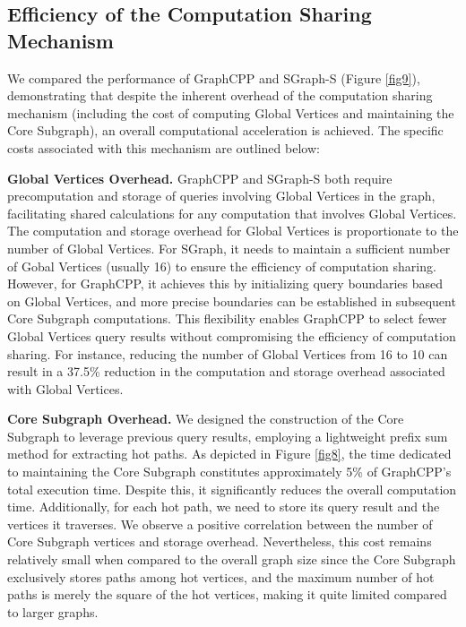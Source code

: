 \documentclass[10pt,journal,compsoc]{IEEEtran}
\begin{document}
\vspace{-8pt}
\subsection{Efficiency of the Computation Sharing Mechanism}
\vspace{-2pt}
We compared the performance of GraphCPP and SGraph-S (Figure \ref{fig9}), demonstrating that despite the inherent overhead of the computation sharing mechanism (including the cost of computing Global Vertices and maintaining the Core Subgraph), an overall computational acceleration is achieved. The specific costs associated with this mechanism are outlined below:

{\bf{Global Vertices Overhead.}} GraphCPP and SGraph-S both require precomputation and storage of queries involving Global Vertices in the graph, facilitating shared calculations for any computation that involves Global Vertices. The computation and storage overhead for Global Vertices is proportionate to the number of Global Vertices. For SGraph, it needs to maintain a sufficient number of Gobal Vertices (usually 16) to ensure the efficiency of computation sharing. However, for GraphCPP, it achieves this by initializing query boundaries based on Global Vertices, and more precise boundaries can be established in subsequent Core Subgraph computations. This flexibility enables GraphCPP to select fewer Global Vertices query results without compromising the efficiency of computation sharing. For instance, reducing the number of Global Vertices from 16 to 10 can result in a 37.5\% reduction in the computation and storage overhead associated with Global Vertices.

{\bf{Core Subgraph Overhead.}} We designed the construction of the Core Subgraph to leverage previous query results, employing a lightweight prefix sum method for extracting hot paths. As depicted in Figure \ref{fig8}, the time dedicated to maintaining the Core Subgraph constitutes approximately 5\% of GraphCPP's total execution time. Despite this, it significantly reduces the overall computation time. Additionally, for each hot path, we need to store its query result and the vertices it traverses. We observe a positive correlation between the number of Core Subgraph vertices and storage overhead. Nevertheless, this cost remains relatively small when compared to the overall graph size since the Core Subgraph exclusively stores paths among hot vertices, and the maximum number of hot paths is merely the square of the hot vertices, making it quite limited compared to larger graphs.
\end{document}
